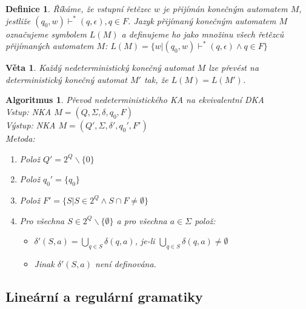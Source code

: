 \documentclass[a4paper, 11pt]{report}
\newtheorem{mydef}{Definice}[chapter]
\newtheorem{veta}{Věta}[chapter]
\newtheorem{alg}{Algoritmus}[chapter]
\begin{document}
\begin{mydef}
Říkáme, že vstupní řetězec $w$ je \emph{přijímán} konečným automatem $M$, jestliže $(q_0, w) \vdash^* (q, \epsilon), q \in F$. Jazyk přijímaný konečným automatem $M$ označujeme symbolem $L(M)$ a definujeme ho jako množinu všech řetězců přijímaných automatem $M$:
$L(M) = \{w | (q_0, w) \vdash^* (q, \epsilon) \land q \in F\}$
\end{mydef}

\begin{veta}
Každý \emph{nedeterministický} konečný automat $M$ lze převést na \emph{deterministický} konečný automat $M'$ tak, že $L(M) = L(M')$.
\end{veta}

\begin{alg}
Převod nedeterministického KA na ekvivalentní DKA\\
Vstup: NKA $M = (Q, \Sigma, \delta, q_0, F)$\\
Výstup: NKA $M = (Q', \Sigma, \delta', q_0', F')$\\
Metoda:
\begin{enumerate}
	\item Polož $Q' = 2^Q \backslash \{0\}$
	\item Polož $q_0' = \{q_0\}$
	\item Polož $F' = \{S | S \in 2^Q \land S \cap F \not= \emptyset\}$
	\item Pro všechna $S \in 2^Q \backslash \{\emptyset\}$ a pro všechna $a \in \Sigma$ polož:
	\begin{itemize}
		\item $\delta'(S, a) = \bigcup_{q \in S} \delta(q, a)$, je-li $\bigcup_{q \in S} \delta(q, a) \not= \emptyset$
		\item Jinak $\delta'(S, a)$ není definována.
	\end{itemize}
\end{enumerate}
\end{alg}

\subsection{Lineární a regulární gramatiky}
\end{document}
